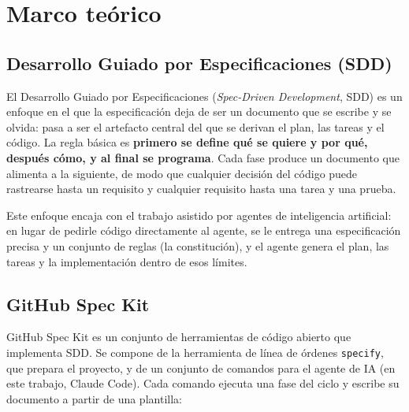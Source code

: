 \documentclass[12pt,a4paper]{article}
\begin{document}
\section{Marco teórico}

\subsection{Desarrollo Guiado por Especificaciones (SDD)}
El Desarrollo Guiado por Especificaciones (\textit{Spec-Driven Development}, SDD) es un enfoque en el que la especificación deja de ser un documento que se escribe y se olvida: pasa a ser el artefacto central del que se derivan el plan, las tareas y el código. La regla básica es \textbf{primero se define qué se quiere y por qué, después cómo, y al final se programa}. Cada fase produce un documento que alimenta a la siguiente, de modo que cualquier decisión del código puede rastrearse hasta un requisito y cualquier requisito hasta una tarea y una prueba.

Este enfoque encaja con el trabajo asistido por agentes de inteligencia artificial: en lugar de pedirle código directamente al agente, se le entrega una especificación precisa y un conjunto de reglas (la constitución), y el agente genera el plan, las tareas y la implementación dentro de esos límites.

\subsection{GitHub Spec Kit}
GitHub Spec Kit es un conjunto de herramientas de código abierto que implementa SDD. Se compone de la herramienta de línea de órdenes \texttt{specify}, que prepara el proyecto, y de un conjunto de comandos para el agente de IA (en este trabajo, Claude Code). Cada comando ejecuta una fase del ciclo y escribe su documento a partir de una plantilla:
\end{document}
